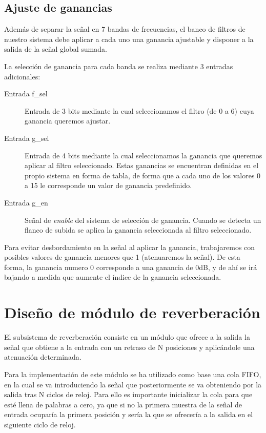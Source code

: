 \documentclass[a4paper,12pt]{article}
\begin{document}
\subsection{Ajuste de ganancias}
Además de separar la señal en 7 bandas de frecuencias, el banco de filtros de nuestro sistema debe aplicar a cada uno una ganancia ajustable y disponer a la salida de la señal global sumada.

La selección de ganancia para cada banda se realiza mediante 3 entradas adicionales:
\begin{description}
\item[Entrada f\_sel] Entrada de 3 bits mediante la cual seleccionamos el filtro (de 0 a 6) cuya ganancia queremos ajustar.
\item[Entrada g\_sel] Entrada de 4 bits mediante la cual seleccionamos la ganancia que queremos aplicar al filtro seleccionado. Estas ganancias se encuentran definidas en el propio sistema en forma de tabla, de forma que a cada uno de los valores 0 a 15 le corresponde un valor de ganancia predefinido.
\item[Entrada g\_en] Señal de \emph{enable} del sistema de selección de ganancia. Cuando se detecta un flanco de subida se aplica la ganancia seleccionada al filtro seleccionado.
\end{description}

Para evitar desbordamiento en la señal al aplicar la ganancia, trabajaremos con posibles valores de ganancia menores que 1 (atenuaremos la señal). De esta forma, la ganancia numero 0 corresponde a una ganancia de 0dB, y de ahí se irá bajando a medida que aumente el índice de la ganancia seleccionada.

\clearpage
\section{Diseño de módulo de reverberación}
El subsistema de reverberación consiste en un módulo que ofrece a la salida la señal que obtiene a la entrada con un retraso de N posiciones y aplicándole una atenuación determinada.

Para la implementación de este módulo se ha utilizado como base una cola FIFO, en la cual se va introduciendo la señal que posteriormente se va obteniendo por la salida tras N ciclos de reloj. Para ello es importante inicializar la cola para que esté llena de palabras a cero, ya que si no la primera muestra de la señal de entrada ocuparía la primera posición y sería la que se ofrecería a la salida en el siguiente ciclo de reloj.
\end{document}
